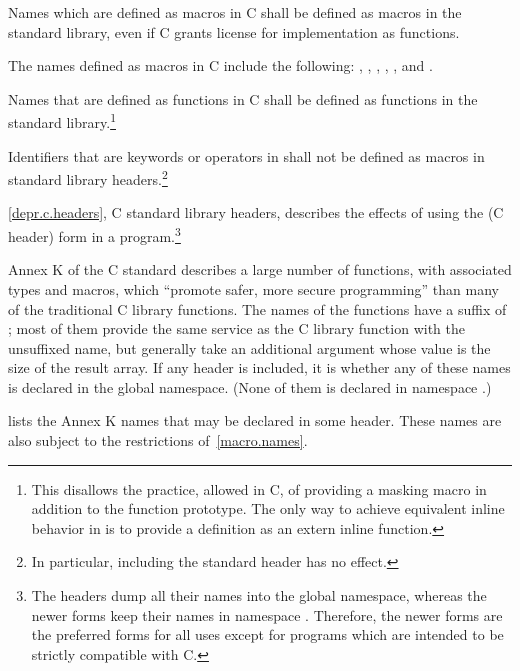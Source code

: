 \pnum
Names which are defined as macros in C shall be defined as macros in the \Cpp{}
standard library, even if C grants license for implementation as functions.
\begin{note}
The names defined as macros in C include the following:
, , , ,
, and .
\end{note}

\pnum
Names that are defined as functions in C shall be defined as functions in the
\Cpp{} standard library.\footnote{This disallows the practice, allowed in C, of
providing a masking macro in addition to the function prototype. The only way to
achieve equivalent inline behavior in \Cpp{} is to provide a definition as an
extern inline function.}

\pnum
Identifiers that are keywords or operators in \Cpp{} shall not be defined as
macros in \Cpp{} standard library headers.\footnote{In particular, including the
standard header  has no effect.}

\pnum
\ref{depr.c.headers}, C standard library headers, describes the effects of using
the  (C header) form in a \Cpp{} program.\footnote{ The
 headers dump all their names into the global namespace, whereas the
newer forms keep their names in namespace . Therefore, the newer
forms are the preferred forms for all uses except for \Cpp{} programs which are
intended to be strictly compatible with C. }

\pnum
Annex K of the C standard describes a large number of functions,
with associated types and macros,
which ``promote safer, more secure programming''
than many of the traditional C library functions.
The names of the functions have a suffix of ;
most of them provide the same service
as the C library function with the unsuffixed name,
but generally take an additional argument
whose value is the size of the result array.
If any \Cpp{} header is included,
it is 
whether any of these names
is declared in the global namespace.
(None of them is declared in namespace .)

\pnum
{} lists the Annex K names
that may be declared in some header.
These names are also subject to the restrictions of~\ref{macro.names}.

